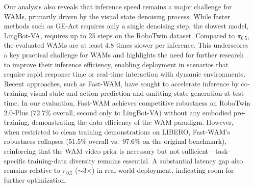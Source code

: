 \documentclass{article}
\begin{document}
Our analysis also reveals that inference speed remains a major challenge for WAMs, primarily driven by the visual state denoising process. While faster methods such as GE-Act requires only a single denoising step, the slowest model, LingBot-VA, requires up to 25 steps on the RoboTwin dataset. Compared to $\pi_{0.5}$, the evaluated WAMs are at least 4.8 times slower per inference. This underscores a key practical challenge for WAMs and highlights the need for further research to improve their inference efficiency, enabling deployment in scenarios that require rapid response time or real-time interaction with dynamic environments. Recent approaches, such as Fast-WAM, have sought to accelerate inference by co-training visual state and action prediction and omitting state generation at test time. In our evaluation, Fast-WAM achieves competitive robustness on RoboTwin 2.0-Plus (72.7\% overall, second only to LingBot-VA) without any embodied pre-training, demonstrating the data efficiency of the WAM paradigm. However, when restricted to clean training demonstrations on LIBERO, Fast-WAM's robustness collapses (51.5\% overall vs.\ 97.6\% on the original benchmark), reinforcing that the WAM video prior is necessary but not sufficient---task-specific training-data diversity remains essential. A substantial latency gap also remains relative to $\pi_{0.5}$ ($\sim$3$\times$) in real-world deployment, indicating room for further optimization.




\end{document}
